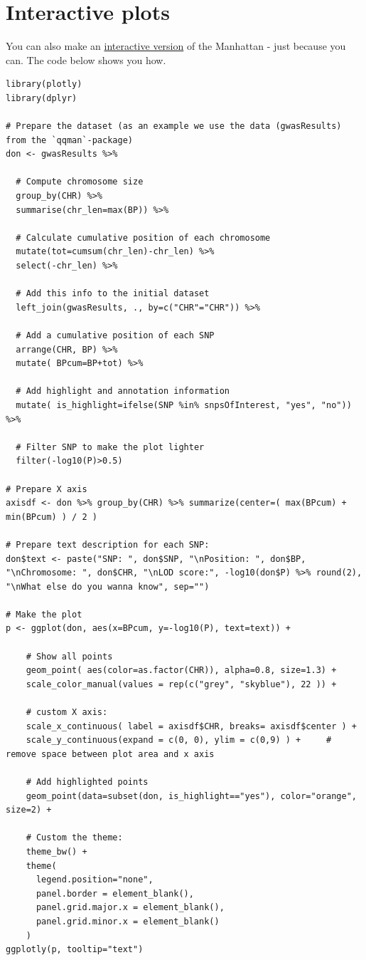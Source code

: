 \documentclass[
]{book}
\begin{document}
\hypertarget{interactive-plots}{%
\section{Interactive plots}\label{interactive-plots}}

You can also make an \href{https://r-graph-gallery.com/101_Manhattan_plot.html}{interactive version} of the Manhattan - just because you can. The code below shows you how.

\begin{verbatim}
library(plotly)
library(dplyr)

# Prepare the dataset (as an example we use the data (gwasResults) from the `qqman`-package)
don <- gwasResults %>%

  # Compute chromosome size
  group_by(CHR) %>%
  summarise(chr_len=max(BP)) %>%

  # Calculate cumulative position of each chromosome
  mutate(tot=cumsum(chr_len)-chr_len) %>%
  select(-chr_len) %>%

  # Add this info to the initial dataset
  left_join(gwasResults, ., by=c("CHR"="CHR")) %>%

  # Add a cumulative position of each SNP
  arrange(CHR, BP) %>%
  mutate( BPcum=BP+tot) %>%

  # Add highlight and annotation information
  mutate( is_highlight=ifelse(SNP %in% snpsOfInterest, "yes", "no")) %>%

  # Filter SNP to make the plot lighter
  filter(-log10(P)>0.5)

# Prepare X axis
axisdf <- don %>% group_by(CHR) %>% summarize(center=( max(BPcum) + min(BPcum) ) / 2 )

# Prepare text description for each SNP:
don$text <- paste("SNP: ", don$SNP, "\nPosition: ", don$BP, "\nChromosome: ", don$CHR, "\nLOD score:", -log10(don$P) %>% round(2), "\nWhat else do you wanna know", sep="")

# Make the plot
p <- ggplot(don, aes(x=BPcum, y=-log10(P), text=text)) +

    # Show all points
    geom_point( aes(color=as.factor(CHR)), alpha=0.8, size=1.3) +
    scale_color_manual(values = rep(c("grey", "skyblue"), 22 )) +

    # custom X axis:
    scale_x_continuous( label = axisdf$CHR, breaks= axisdf$center ) +
    scale_y_continuous(expand = c(0, 0), ylim = c(0,9) ) +     # remove space between plot area and x axis

    # Add highlighted points
    geom_point(data=subset(don, is_highlight=="yes"), color="orange", size=2) +

    # Custom the theme:
    theme_bw() +
    theme(
      legend.position="none",
      panel.border = element_blank(),
      panel.grid.major.x = element_blank(),
      panel.grid.minor.x = element_blank()
    )
ggplotly(p, tooltip="text")
\end{verbatim}
\end{document}
